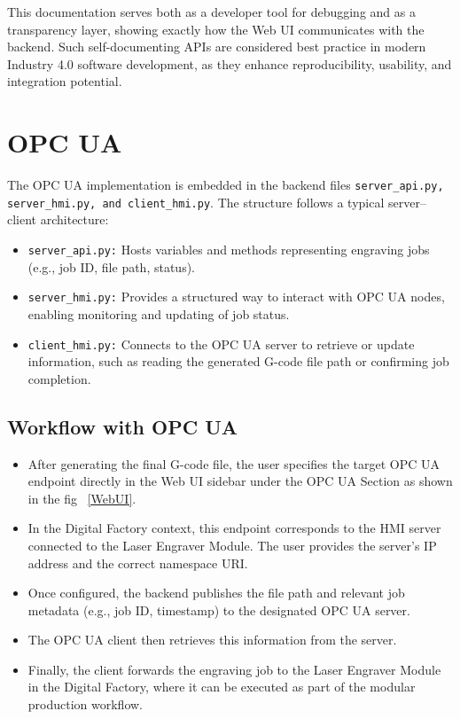This documentation serves both as a developer tool for debugging and as a transparency layer, showing exactly how the Web UI communicates with the backend. Such self-documenting APIs are considered best practice in modern Industry 4.0 software development, as they enhance reproducibility, usability, and integration potential.

\section{OPC UA}
The OPC UA implementation is embedded in the backend files \texttt{server\_api.py, server\_hmi.py, and client\_hmi.py}. The structure follows a typical server–client architecture:
\begin{itemize}
	\item \texttt{server\_api.py:} Hosts variables and methods representing engraving jobs (e.g., job ID, file path, status).
	\item \texttt{server\_hmi.py:} Provides a structured way to interact with OPC UA nodes, enabling monitoring and updating of job status.
	\item \texttt{client\_hmi.py:} Connects to the OPC UA server to retrieve or update information, such as reading the generated G-code file path or confirming job completion.
\end{itemize}


\subsection{Workflow with OPC UA}
\begin{itemize}
	\item After generating the final G-code file, the user specifies the target OPC UA endpoint directly in the Web UI sidebar under the OPC UA Section as shown in the fig ~\ref{WebUI}.
\item In the Digital Factory context, this endpoint corresponds to the HMI server connected to the Laser Engraver Module. The user provides the server’s IP address and the correct namespace URI.
\item Once configured, the backend publishes the file path and relevant job metadata (e.g., job ID, timestamp) to the designated OPC UA server.
\item The OPC UA client then retrieves this information from the server.
\item Finally, the client forwards the engraving job to the Laser Engraver Module in the Digital Factory, where it can be executed as part of the modular production workflow.
\end{itemize}


